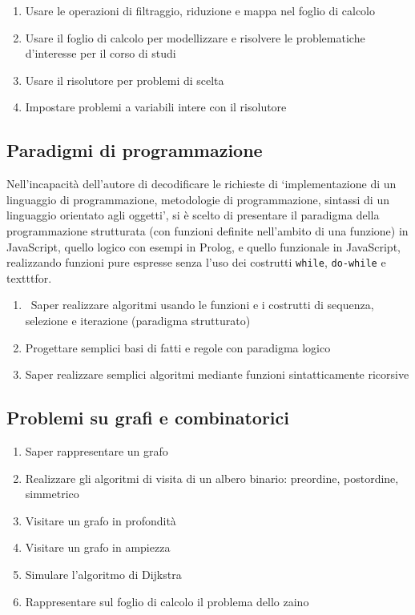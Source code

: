 \documentclass{easychair}
\begin{document}
\begin{enumerate}
  \item
    Usare le operazioni di filtraggio, riduzione e mappa nel foglio di
    calcolo
  \item
    Usare il foglio di calcolo per modellizzare e risolvere le
    problematiche d'interesse per il corso di studi
  \item
    Usare il risolutore per problemi di scelta
  \item
    Impostare problemi a variabili intere con il risolutore
\end{enumerate}

\subsection[Paradigmi]{Paradigmi di programmazione}

Nell'incapacità dell'autore di decodificare le richieste
di `implementazione di un linguaggio di programmazione,
metodologie di programmazione, sintassi di un linguaggio
orientato agli oggetti', si è scelto di presentare il paradigma
della programmazione strutturata (con funzioni definite nell'ambito 
di una funzione) in JavaScript, quello logico con esempi in Prolog,
e quello funzionale in JavaScript, realizzando funzioni pure espresse
senza l'uso dei costrutti \texttt{while}, \texttt{do-while} e texttt{for}.

\begin{enumerate}
  \item\
    Saper realizzare algoritmi usando le funzioni e 
    i costrutti di sequenza, selezione e iterazione (paradigma strutturato)
  \item
    Progettare semplici basi di fatti e regole con paradigma logico
  \item
    Saper realizzare semplici algoritmi mediante funzioni sintatticamente ricorsive
\end{enumerate}

\subsection[Grafi]{Problemi su grafi e combinatorici}

\begin{enumerate}
  \item Saper rappresentare un grafo
  \item
    Realizzare gli algoritmi di visita di un albero binario: preordine,
    postordine, simmetrico %
  \item
    Visitare un grafo in profondità
  \item
    Visitare un grafo in ampiezza
  \item
    Simulare l'algoritmo di Dijkstra
  \item Rappresentare sul foglio di calcolo il problema dello zaino
\end{enumerate}
\end{document}
